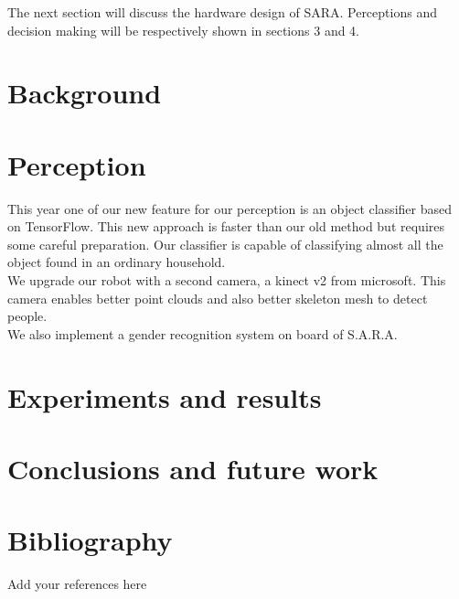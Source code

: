 \documentclass[runningheads,a4paper]{llncs}
\begin{document}
The next section will discuss the hardware design of SARA. Perceptions and decision making will be respectively shown in sections 3 and 4.


\section{Background}
\lipsum[1-3]

\section{Perception}

\tab This year one of our new feature for our perception is an object classifier based on TensorFlow. This new approach is faster than our old method but requires some careful preparation. Our classifier is capable of classifying almost all the object found in an ordinary household. \\

We upgrade our robot with a second camera, a kinect v2 from microsoft. This camera enables better point clouds and also better skeleton mesh to detect people. \\

We also implement a gender recognition system on board of S.A.R.A.



\section{Experiments and results}
\lipsum[15-20]

\section{Conclusions and future work}
\lipsum[21-24]

\section*{Bibliography}
Add your references here
%
%

\newpage

\end{document}
